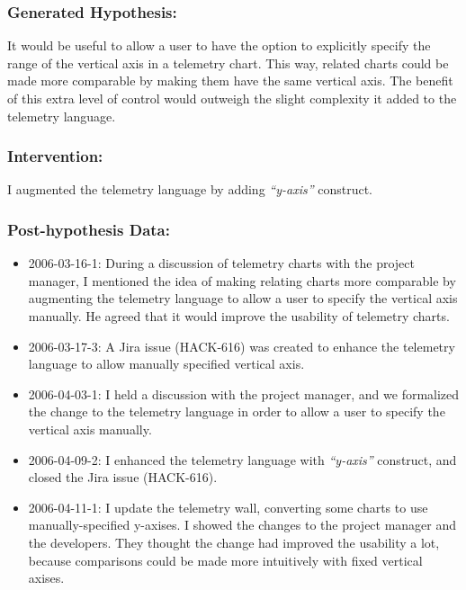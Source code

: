 \subsubsection{Generated Hypothesis:}

It would be useful to allow a user to have the option to explicitly specify the range of the vertical axis in a telemetry chart. This way, related charts could be made more comparable by making them have the same vertical axis. The benefit of this extra level of control would outweigh the slight complexity it added to the telemetry language.

\subsubsection{Intervention:}

I augmented the telemetry language by adding \textit{``y-axis''} construct.

\subsubsection{Post-hypothesis Data:}
\begin{itemize}
  \setlength{\itemsep}{0pt}
  \setlength{\parskip}{0pt}
  \item 2006-03-16-1: During a discussion of telemetry charts with the project manager, I mentioned the idea of making relating charts more comparable by augmenting the telemetry language to allow a user to specify the vertical axis manually. He agreed that it would improve the usability of telemetry charts. 
  \item 2006-03-17-3: A Jira issue (HACK-616) was created to enhance the telemetry language to allow manually specified vertical axis.
  \item 2006-04-03-1: I held a discussion with the project manager, and we formalized the change to the telemetry language in order to allow a user to specify the vertical axis manually.
  \item 2006-04-09-2: I enhanced the telemetry language with \textit{``y-axis''} construct, and closed the Jira issue (HACK-616). 
  \item 2006-04-11-1: I update the telemetry wall, converting some charts to use manually-specified y-axises. I showed the changes to the project manager and the developers. They thought the change had improved the usability a lot, because comparisons could be made more intuitively with fixed vertical axises. 
\end{itemize}

